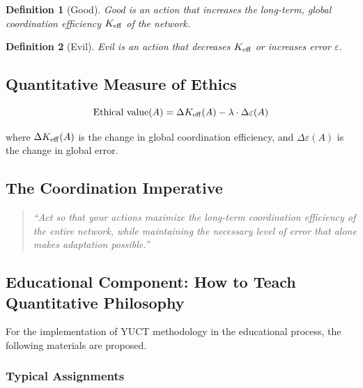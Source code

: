 \documentclass[12pt,a4paper]{article}
\newcommand{\eps}{\varepsilon}
\newtheorem{definition}{Definition}[section]
\begin{document}
	\begin{definition}[Good]
		Good is an action that increases the long-term, global coordination efficiency \(\Keff\) of the network.
	\end{definition}
	
	\begin{definition}[Evil]
		Evil is an action that decreases \(\Keff\) or increases error \(\eps\).
	\end{definition}
	
	\subsection{Quantitative Measure of Ethics}
	
	\begin{equation}
		\text{Ethical value}(A) = \Delta \Keff(A) - \lambda \cdot \Delta \eps(A)
	\end{equation}
	
	where \(\Delta \Keff(A)\) is the change in global coordination efficiency, and \(\Delta \eps(A)\) is the change in global error.
	
	\subsection{The Coordination Imperative}
	
	\begin{quote}
		\textit{``Act so that your actions maximize the long-term coordination efficiency of the entire network, while maintaining the necessary level of error that alone makes adaptation possible.''}
	\end{quote}
	
	\subsection{Educational Component: How to Teach Quantitative Philosophy}
	\label{sec:educational}
	
	For the implementation of YUCT methodology in the educational process, the following materials are proposed.
	
	\subsubsection{Typical Assignments}
	
\end{document}
